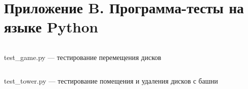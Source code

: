 \section*{Приложение B. Программа-тесты на языке Python}
\begin{code}
	\inputminted[breaklines=true, xleftmargin=1em, linenos, frame=single,	framesep=10pt, fontsize=\footnotesize]{python}{../src/tests/test_game.py}
	\caption{test\_game.py --- тестирование перемещения дисков}
\end{code}
\begin{code}
	\inputminted[breaklines=true, xleftmargin=1em, linenos, frame=single,	framesep=10pt, fontsize=\footnotesize]{python}{../src/tests/test_tower.py}
	\caption{test\_tower.py --- тестирование помещения и удаления дисков с башни}
\end{code}
